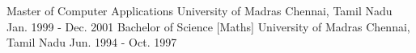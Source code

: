 \begin{cventries}
  \cventry
    {Master of Computer Applications}
    {University of Madras}
    {Chennai, Tamil Nadu}
    {Jan. 1999 - Dec. 2001}
    {      
    }
  \cventry
  {Bachelor of Science [Maths]}
  {University of Madras}
  {Chennai, Tamil Nadu}
  {Jun. 1994 - Oct. 1997}
  {
  }
\end{cventries}